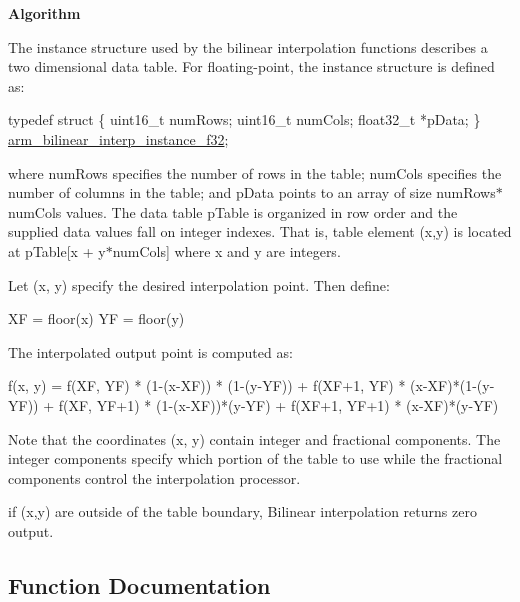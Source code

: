 {\bfseries Algorithm} \begin{DoxyParagraph}{}
The instance structure used by the bilinear interpolation functions describes a two dimensional data table. For floating-\/point, the instance structure is defined as\+: 
\begin{DoxyPre}
  typedef struct
  \{
    uint16\_t numRows;
    uint16\_t numCols;
    float32\_t *pData;
\} \mbox{\hyperlink{structarm__bilinear__interp__instance__f32}{arm\_bilinear\_interp\_instance\_f32}};
\end{DoxyPre}

\end{DoxyParagraph}
\begin{DoxyParagraph}{}
where {\ttfamily num\+Rows} specifies the number of rows in the table; {\ttfamily num\+Cols} specifies the number of columns in the table; and {\ttfamily p\+Data} points to an array of size {\ttfamily num\+Rows$\ast$num\+Cols} values. The data table {\ttfamily p\+Table} is organized in row order and the supplied data values fall on integer indexes. That is, table element (x,y) is located at {\ttfamily p\+Table\mbox{[}x + y$\ast$num\+Cols\mbox{]}} where x and y are integers.
\end{DoxyParagraph}
\begin{DoxyParagraph}{}
Let {\ttfamily (x, y)} specify the desired interpolation point. Then define\+: 
\begin{DoxyPre}
    XF = floor(x)
    YF = floor(y)
\end{DoxyPre}
 
\end{DoxyParagraph}
\begin{DoxyParagraph}{}
The interpolated output point is computed as\+: 
\begin{DoxyPre}
 f(x, y) = f(XF, YF) * (1-(x-XF)) * (1-(y-YF))
          + f(XF+1, YF) * (x-XF)*(1-(y-YF))
          + f(XF, YF+1) * (1-(x-XF))*(y-YF)
          + f(XF+1, YF+1) * (x-XF)*(y-YF)
\end{DoxyPre}
 Note that the coordinates (x, y) contain integer and fractional components. The integer components specify which portion of the table to use while the fractional components control the interpolation processor.
\end{DoxyParagraph}
\begin{DoxyParagraph}{}
if (x,y) are outside of the table boundary, Bilinear interpolation returns zero output. 
\end{DoxyParagraph}


\subsection{Function Documentation}
\mbox{\label{group___bilinear_interpolate_gaba67d2ba2acbd428832f106de29b8627}} 
